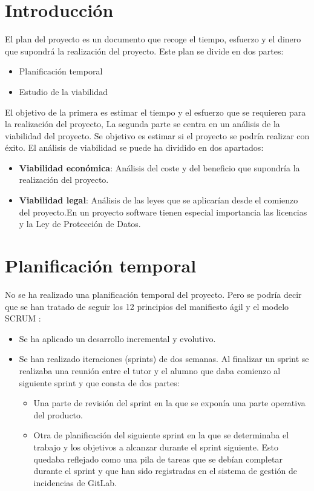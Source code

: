 
\section{Introducción}
El plan del proyecto es un documento que recoge el tiempo, esfuerzo y el dinero que supondrá la realización del proyecto.
Este plan se divide en dos partes:
\begin{itemize}
	\tightlist
	\item Planificación temporal
	\item Estudio de la viabilidad
\end{itemize}
El objetivo de la primera es estimar el tiempo y el esfuerzo que se requieren para la realización del proyecto, 
La segunda parte se centra en un análisis de la viabilidad del proyecto. Se objetivo es estimar si el proyecto se podría realizar con éxito. El análisis de viabilidad se puede ha dividido en dos apartados:
\begin{itemize}
	\tightlist
	\item
	\textbf{Viabilidad económica}: Análisis del coste y del beneficio que supondría la realización del proyecto.
	\item
	\textbf{Viabilidad legal}: Análisis de las leyes que se aplicarían desde el comienzo del proyecto.En un proyecto software tienen especial importancia las licencias y la Ley
	de Protección de Datos.
\end{itemize}

\section{Planificación temporal}
No se ha realizado una planificación temporal del proyecto. Pero se podría decir que se han tratado de seguir los 12 principios del manifiesto ágil y el modelo SCRUM \cite{noauthor_scrum_2019}:
\begin{itemize}
	\tightlist
	\item Se ha aplicado un desarrollo incremental y evolutivo.
	\item Se han realizado iteraciones (sprints) de dos semanas. Al finalizar un sprint se realizaba una reunión entre el tutor y el alumno que daba comienzo al siguiente sprint y que consta de dos partes:
	\begin{itemize}
		\item Una parte de revisión del sprint en la que se exponía una parte operativa del producto.
		\item Otra de planificación del siguiente sprint en la que se determinaba el trabajo y los objetivos a alcanzar durante el sprint siguiente. Esto quedaba reflejado como una pila de tareas que se debían completar durante el sprint y que han sido registradas en el sistema de gestión de incidencias de GitLab.
	\end{itemize}
\end{itemize}
